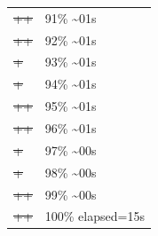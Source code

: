 \documentclass[12pt]{article}
\begin{document}
\begin{center}
\begin{tabular}{ll}
\sout{\sout{\sout{\sout{\sout{\sout{\sout{\sout{\sout{\sout{\sout{\sout{\sout{\sout{\sout{\sout{\sout{\sout{\sout{\sout{\sout{\sout{++}}}}}}}}}}}}}}}}}}}}}} & 91\% \textasciitilde{}01s\\
\sout{\sout{\sout{\sout{\sout{\sout{\sout{\sout{\sout{\sout{\sout{\sout{\sout{\sout{\sout{\sout{\sout{\sout{\sout{\sout{\sout{\sout{++}}}}}}}}}}}}}}}}}}}}}} & 92\% \textasciitilde{}01s\\
\sout{\sout{\sout{\sout{\sout{\sout{\sout{\sout{\sout{\sout{\sout{\sout{\sout{\sout{\sout{\sout{\sout{\sout{\sout{\sout{\sout{\sout{\sout{+}}}}}}}}}}}}}}}}}}}}}}} & 93\% \textasciitilde{}01s\\
\sout{\sout{\sout{\sout{\sout{\sout{\sout{\sout{\sout{\sout{\sout{\sout{\sout{\sout{\sout{\sout{\sout{\sout{\sout{\sout{\sout{\sout{\sout{+}}}}}}}}}}}}}}}}}}}}}}} & 94\% \textasciitilde{}01s\\
\sout{\sout{\sout{\sout{\sout{\sout{\sout{\sout{\sout{\sout{\sout{\sout{\sout{\sout{\sout{\sout{\sout{\sout{\sout{\sout{\sout{\sout{\sout{++}}}}}}}}}}}}}}}}}}}}}}} & 95\% \textasciitilde{}01s\\
\sout{\sout{\sout{\sout{\sout{\sout{\sout{\sout{\sout{\sout{\sout{\sout{\sout{\sout{\sout{\sout{\sout{\sout{\sout{\sout{\sout{\sout{\sout{++}}}}}}}}}}}}}}}}}}}}}}} & 96\% \textasciitilde{}01s\\
\sout{\sout{\sout{\sout{\sout{\sout{\sout{\sout{\sout{\sout{\sout{\sout{\sout{\sout{\sout{\sout{\sout{\sout{\sout{\sout{\sout{\sout{\sout{\sout{+}}}}}}}}}}}}}}}}}}}}}}}} & 97\% \textasciitilde{}00s\\
\sout{\sout{\sout{\sout{\sout{\sout{\sout{\sout{\sout{\sout{\sout{\sout{\sout{\sout{\sout{\sout{\sout{\sout{\sout{\sout{\sout{\sout{\sout{\sout{+}}}}}}}}}}}}}}}}}}}}}}}} & 98\% \textasciitilde{}00s\\
\sout{\sout{\sout{\sout{\sout{\sout{\sout{\sout{\sout{\sout{\sout{\sout{\sout{\sout{\sout{\sout{\sout{\sout{\sout{\sout{\sout{\sout{\sout{\sout{++}}}}}}}}}}}}}}}}}}}}}}}} & 99\% \textasciitilde{}00s\\
\sout{\sout{\sout{\sout{\sout{\sout{\sout{\sout{\sout{\sout{\sout{\sout{\sout{\sout{\sout{\sout{\sout{\sout{\sout{\sout{\sout{\sout{\sout{\sout{++}}}}}}}}}}}}}}}}}}}}}}}} & 100\% elapsed=15s\\
\end{tabular}
\end{center}
\end{document}
